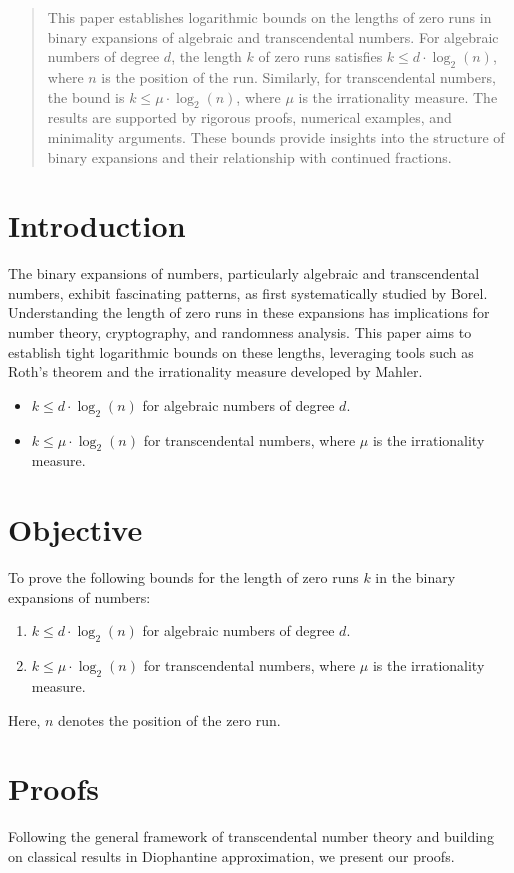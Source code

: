 \begin{abstract}
This paper establishes logarithmic bounds on the lengths of zero runs in binary
expansions of algebraic and transcendental numbers. For algebraic numbers of
degree $d$, the length $k$ of zero runs satisfies $k \leq d \cdot \log_2(n)$, where $n$ is the position
of the run. Similarly, for transcendental numbers, the bound is $k \leq \mu \cdot \log_2(n)$,
where $\mu$ is the irrationality measure. The results are supported by rigorous proofs,
numerical examples, and minimality arguments. These bounds provide insights into
the structure of binary expansions and their relationship with continued fractions.
\end{abstract}

\section{Introduction}
The binary expansions of numbers, particularly algebraic and transcendental numbers,
exhibit fascinating patterns, as first systematically studied by Borel. 
Understanding the length of zero runs in these expansions has implications for number 
theory, cryptography, and randomness analysis. 
This paper aims to establish tight logarithmic bounds on these lengths, leveraging tools such as
Roth's theorem and the irrationality measure developed by Mahler. 
\begin{itemize}
    \item $k \leq d \cdot \log_2(n)$ for algebraic numbers of degree $d$.
    \item $k \leq \mu \cdot \log_2(n)$ for transcendental numbers, where $\mu$ is the irrationality measure.
\end{itemize}

\section{Objective}
To prove the following bounds for the length of zero runs $k$ in the binary expansions of
numbers:
\begin{enumerate}
    \item $k \leq d \cdot \log_2(n)$ for algebraic numbers of degree $d$.
    \item $k \leq \mu \cdot \log_2(n)$ for transcendental numbers, where $\mu$ is the irrationality measure.
\end{enumerate}
Here, $n$ denotes the position of the zero run.

\section{Proofs}
Following the general framework of transcendental number theory and building 
on classical results in Diophantine approximation, we present our proofs.

